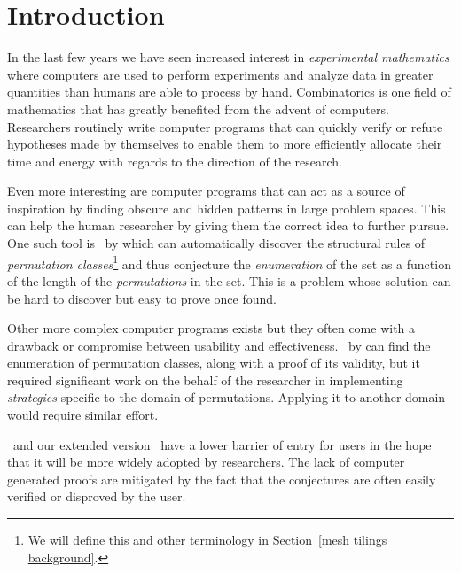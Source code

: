 \chapter{Introduction\label{cha:introduction}}

In the last few years we have seen increased interest in \emph{experimental 
mathematics} where computers are used to perform experiments and analyze data 
in greater quantities than humans are able to process by hand. Combinatorics is 
one field of mathematics that has greatly benefited from the advent of 
computers. Researchers routinely write computer programs that can quickly 
verify or refute hypotheses made by themselves to enable them to more
efficiently allocate their time and energy with regards to the direction of the 
research. 

Even more interesting are computer programs that can act as a source of
inspiration by finding obscure and hidden patterns in large problem spaces. 
This can help the human researcher by giving them the correct idea to further
pursue. One such tool is \Struct\ by \textcite{bean_automatic_2019} which can
automatically discover the structural rules of \emph{permutation 
classes}\footnote{We will define this and other terminology in 
Section~\ref{mesh tilings background}.} and thus conjecture the 
\emph{enumeration} of the set as a function of the length of the 
\emph{permutations} in the set. This is a problem whose solution can be hard to 
discover but easy to prove once found.

Other more complex computer programs exists but they often come with a drawback
or compromise between usability and effectiveness. \CombSpecSearcher\ by 
\textcite{bean_finding_2018} can find the enumeration of permutation classes, 
along with a proof of its validity, but it required significant work on the 
behalf of the researcher in implementing \emph{strategies} specific to the 
domain of permutations. Applying it to another domain would require similar
effort.  

\Struct\ and our extended version \CombCov\ have a lower barrier of entry for 
users in the hope that it will be more widely adopted by researchers. The lack 
of computer generated proofs are mitigated by the fact that the conjectures are 
often easily verified or disproved by the user.


